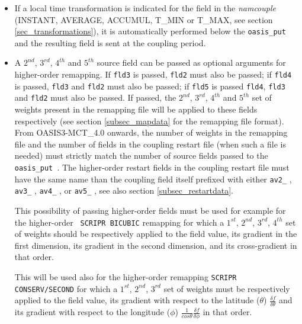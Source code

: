 \begin{itemize}
\item If a local time transformation is indicated for the field in the {\it namcouple} (INSTANT, AVERAGE, ACCUMUL, T\_MIN or
  T\_MAX, see section \ref{sec_transformations}), it is automatically
  performed below the {\tt oasis\_put} and the resulting field is sent at the coupling period.
  

\item A $2^{nd}$, $3^{rd}$, $4^{th}$ and $5^{th}$ source field can be
  passed as optional arguments for higher-order remapping. If {\tt fld3}  is passed, {\tt fld2}  must also be passed; if {\tt fld4}  is passed, {\tt fld3}  and {\tt fld2}  must also be passed; if {\tt fld5}  is passed {\tt fld4}, {\tt fld3}  and {\tt fld2} must also be passed. If passed, the $2^{nd}$, $3^{rd}$, $4^{th}$ and $5^{th}$ set of weights present in the remapping file will be applied to these fields respectively (see section \ref{subsec_mapdata} for the remapping file format). 
  From OASIS3-MCT\_4.0 onwards, the number of weights in the remapping file and the number of fields in the coupling restart file
(when such a file is needed) must strictly match the number of source fields passed to the {\tt oasis\_put }. The higher-order restart fields in the coupling restart file must have the same name than the coupling field itself prefixed with either {\tt av2\_} , {\tt av3\_} , {\tt av4\_} , or {\tt av5\_} , see also section \ref{subsec_restartdata}.

This possibility of passing higher-order fields must be used for example for the higher-order {\tt
    SCRIPR BICUBIC} remapping for which a $1^{st}$, $2^{nd}$,
  $3^{rd}$, $4^{th}$ set of weights should be respectively applied to
  the field value, its gradient in the first dimension, its gradient
  in the second dimension, and its cross-gradient in that order. 
  
  This will be used also for the higher-order remapping {\tt SCRIPR CONSERV/SECOND} for which a $1^{st}$, $2^{nd}$,
  $3^{rd}$
  set of weights must be respectively applied to the field value, its
  gradient with respect to the latitude ($\theta$) $\frac{\delta f}{\delta \theta}$
  and its gradient with respect to the longitude ($\phi$) $\frac{1}{cos \theta}\frac{\delta f}{\delta \phi}$
  in that order. 


\end{itemize}
